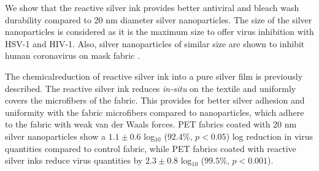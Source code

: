 \documentclass[10pt,letterpaper]{article}
\begin{document}
We show that the reactive silver ink provides better antiviral and bleach wash durability compared to 20 nm diameter silver nanoparticles. The size of the silver nanoparticles is considered as it is the maximum size to offer virus inhibition with HSV-1 and HIV-1. \cite{akbarzadeh:2018,elechiguerra_interaction_2005} Also, silver nanoparticles of similar size are shown to inhibit human coronavirus on mask fabric \cite{abulikemu:2022}. 

The chemicalreduction of reactive silver ink into a pure silver film is previously described.\cite{Walker:12} The reactive silver ink reduces \textit{in-situ}
on the textile and uniformly covers 
the microfibers of the fabric.
This provides for better silver adhesion and uniformity with the fabric microfibers compared to nanoparticles, which adhere to the fabric with weak van der Waals forces. 
PET fabrics coated with 20 nm silver nanoparticles %
show a $1.1 \pm 0.6$ log$_{10}$ ($92.4 %
\%$, $p < 0.05$) log reduction in virus quantities compared to control fabric, 
while PET fabrics coated with reactive silver inks reduce virus quantities by $2.3 \pm 0.8$ log$_{10}$ ($99.5 %
\%$, $p < 0.001$). 
\end{document}
